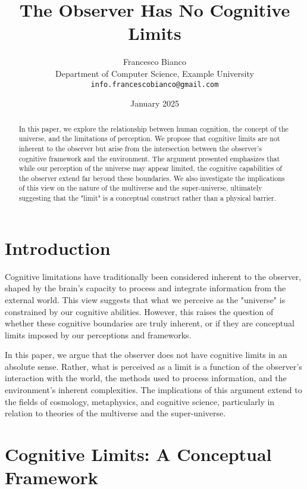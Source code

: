 \documentclass[twocolumn]{article}
\title{The Observer Has No Cognitive Limits}
\author{Francesco Bianco \\
Department of Computer Science, Example University \\
\texttt{info.francescobianco@gmail.com}}
\date{January 2025}
\begin{document}
    \maketitle

    \begin{abstract}
        In this paper, we explore the relationship between human cognition,
        the concept of the universe, and the limitations of perception.
        We propose that cognitive limits are not inherent to the observer
        but arise from the intersection between the observer's cognitive framework and the environment.
        The argument presented emphasizes that while our perception of the universe may appear limited,
        the cognitive capabilities of the observer extend far beyond these boundaries.
        We also investigate the implications of this view on the nature of the multiverse and the super-universe,
        ultimately suggesting that the "limit" is a conceptual construct rather than a physical barrier.
    \end{abstract}

    \section{Introduction}
    \label{sec:introduction}

    Cognitive limitations have traditionally been considered inherent to the observer,
    shaped by the brain's capacity to process and integrate information from the external world.
    This view suggests that what we perceive as the "universe" is constrained by our cognitive abilities.
    However, this raises the question of whether these cognitive boundaries are truly inherent,
    or if they are conceptual limits imposed by our perceptions and frameworks.

    In this paper, we argue that the observer does not have cognitive limits in an absolute sense.
    Rather, what is perceived as a limit is a function of the observer's interaction with the world,
    the methods used to process information, and the environment's inherent complexities.
    The implications of this argument extend to the fields of cosmology, metaphysics, and cognitive science,
    particularly in relation to theories of the multiverse and the super-universe.

    \section{Cognitive Limits: A Conceptual Framework}
    \label{sec:cognitive-limits:-a-conceptual-framework}
\end{document}

